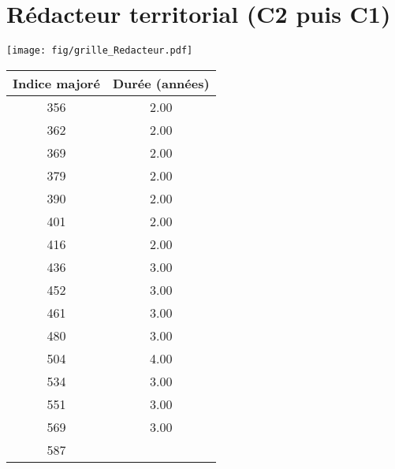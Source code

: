 \newpage 
 
\chapter{Rédacteur territorial (C2 puis C1)} 

\begin{minipage}{0.55\linewidth}\texttt{[image: fig/grille\_Redacteur.pdf]}\end{minipage} 
\begin{minipage}{0.3\linewidth} 
 \begin{center} 

\begin{tabular}[htb]{|c|c|} 
\hline 
 Indice majoré &  Durée (années) \\ 
\hline \hline 
 356 &  2.00 \\ 
\hline 
 362 &  2.00 \\ 
\hline 
 369 &  2.00 \\ 
\hline 
 379 &  2.00 \\ 
\hline 
 390 &  2.00 \\ 
\hline 
 401 &  2.00 \\ 
\hline 
 416 &  2.00 \\ 
\hline 
 436 &  3.00 \\ 
\hline 
 452 &  3.00 \\ 
\hline 
 461 &  3.00 \\ 
\hline 
 480 &  3.00 \\ 
\hline 
 504 &  4.00 \\ 
\hline 
 534 &  3.00 \\ 
\hline 
 551 &  3.00 \\ 
\hline 
 569 &  3.00 \\ 
\hline 
 587 &   \\ 
\hline 
\hline 
\end{tabular} 
\end{center} 
 \end{minipage} 

~\\ 
 


   
 \localtableofcontents 

